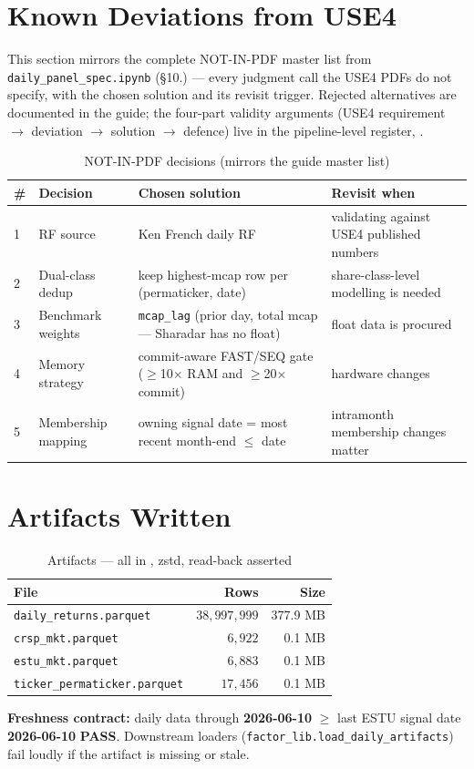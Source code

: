 \documentclass[11pt,a4paper]{article}
\newcommand{\PASS}[1]{\textcolor{pass}{\textbf{#1}}}
\begin{document}
\section{Known Deviations from USE4}

This section mirrors the complete NOT-IN-PDF master list from
\texttt{daily\_panel\_spec.ipynb} (\S10.) --- every judgment call the USE4 PDFs do not
specify, with the chosen solution and its revisit trigger. Rejected alternatives
are documented in the guide; the four-part validity arguments (USE4 requirement
$\to$ deviation $\to$ solution $\to$ defence) live in the pipeline-level
register, .

\begin{longtable}{@{}p{0.5cm}p{3.6cm}p{6.0cm}p{3.8cm}@{}}
\caption{NOT-IN-PDF decisions (mirrors the guide master list)}\\
\toprule
\textbf{\#} & \textbf{Decision} & \textbf{Chosen solution} & \textbf{Revisit when} \\
\midrule
\endhead
1 & RF source & Ken French daily RF & validating against USE4 published numbers \\[3pt]
2 & Dual-class dedup & keep highest-mcap row per (permaticker, date) & share-class-level modelling is needed \\[3pt]
3 & Benchmark weights & \texttt{mcap\_lag} (prior day, total mcap --- Sharadar has no float) & float data is procured \\[3pt]
4 & Memory strategy & commit-aware FAST/SEQ gate ($\geq$10$\times$ RAM and $\geq$20$\times$ commit) & hardware changes \\[3pt]
5 & Membership mapping & owning signal date = most recent month-end $\leq$ date & intramonth membership changes matter \\[3pt]
\bottomrule
\end{longtable}

\section{Artifacts Written}

\begin{table}[h!]
\centering
\caption{Artifacts --- all in , zstd, read-back asserted}
\small
\begin{tabular}{lrr}
\toprule
\textbf{File} & \textbf{Rows} & \textbf{Size} \\
\midrule
\texttt{daily\_returns.parquet} & $38{,}997{,}999$ & 377.9 MB \\
\texttt{crsp\_mkt.parquet} & $6{,}922$ & 0.1 MB \\
\texttt{estu\_mkt.parquet} & $6{,}883$ & 0.1 MB \\
\texttt{ticker\_permaticker.parquet} & $17{,}456$ & 0.1 MB \\
\bottomrule
\end{tabular}
\end{table}

\textbf{Freshness contract:} daily data through \textbf{2026-06-10} $\geq$ last
ESTU signal date \textbf{2026-06-10} \PASS{PASS}. Downstream loaders
(\texttt{factor\_lib.load\_daily\_artifacts}) fail loudly if the artifact is
missing or stale.
\end{document}
